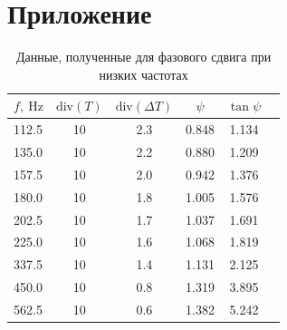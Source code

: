 \documentclass[12pt, a4paper]{article}
\newcommand{\Hz}{~\mathrm{Hz}}
\begin{document}
\section{Приложение}
\begin{table}[h]
  \centering
  \begin{tabular}{|l|c|c|c|c|c|}
    \hline
    $f, \Hz $& $\text{div}(T)$ & $\text{div}(\Delta T)$ & $\psi$ & $\tan{\psi}$ \\
    \hline
    112.5 & 10 & 2.3 & 0.848 & 1.134 \\
    135.0 & 10 & 2.2 & 0.880 & 1.209 \\
    157.5 & 10 & 2.0 & 0.942 & 1.376 \\
    180.0 & 10 & 1.8 & 1.005 & 1.576 \\
    202.5 & 10 & 1.7 & 1.037 & 1.691 \\
    225.0 & 10 & 1.6 & 1.068 & 1.819 \\
    337.5 & 10 & 1.4 & 1.131 & 2.125 \\
    450.0 & 10 & 0.8 & 1.319 & 3.895 \\
    562.5 & 10 & 0.6 & 1.382 & 5.242 \\
    \hline
  \end{tabular}
  \caption{Данные, полученные для фазового сдвига при низких частотах}
  \label{table:phase_low_freq}

\end{table}
\end{document}
